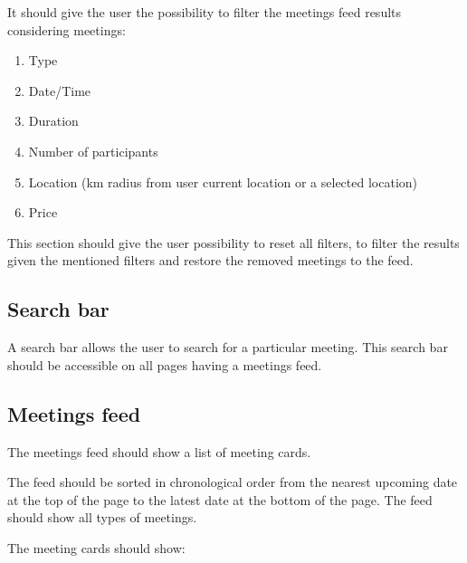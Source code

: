 \documentclass[conference]{IEEEtran}
\begin{document}
It should give the user the possibility to filter the meetings feed results considering meetings:

\begin{enumerate}
    \item Type
    \item Date/Time
    \item Duration
    \item Number of participants
    \item Location (km radius from user current location or a selected location)
    \item Price
\end{enumerate}

This section should give the user possibility to reset all filters, to filter the results given the mentioned filters and restore the removed meetings to the feed.

\subsection{Search bar}

A search bar allows the user to search for a particular meeting. 
This search bar should be accessible on all pages having a meetings feed.

\subsection{Meetings feed}

The meetings feed should show a list of meeting cards. 

The feed should be sorted in chronological order from the nearest upcoming date at the top of the page to the latest date at the bottom of the page. 
The feed should show all types of meetings.

The meeting cards should show:
\end{document}
